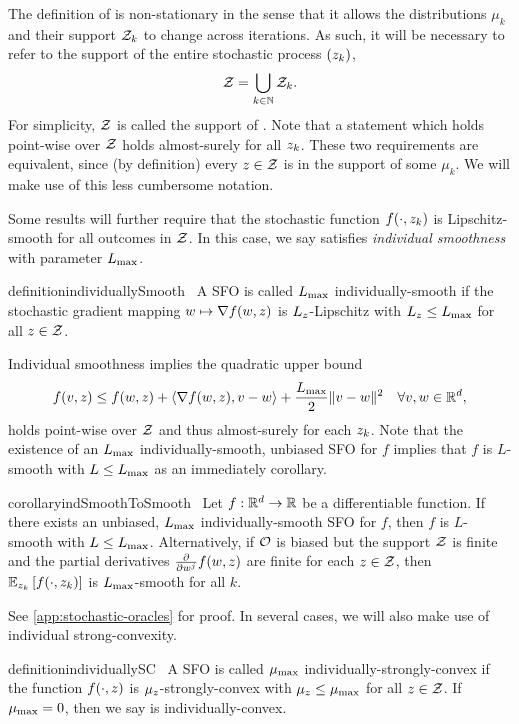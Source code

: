 The definition of \oracle{} is non-stationary in the sense that it allows the distributions \( \mu_k \) and their support \( \calZ_k \) to change across iterations.
As such, it will be necessary to refer to the support of the entire stochastic process \( \seq{\zk} \), 
\[ \calZ = \bigcup_{k\in \bbN} \calZ_k. \]
For simplicity, \( \calZ \) is called the support of \oracle{}. 
Note that a statement which holds point-wise over \( \calZ \) holds almost-surely for all \( \zk \).
These two requirements are equivalent, since (by definition) every \( \z \in \calZ \) is in the support of some \( \mu_k \).
We will make use of this less cumbersome notation. 

Some results will further require that the stochastic function \( f(\cdot, \zk) \) is Lipschitz-smooth for all outcomes in \( \calZ \).
In this case, we say \oracle{} satisfies \emph{individual smoothness} with parameter \( \Lmax \).
\begin{restatable}{definition}{individuallySmooth}~\label{def:individually-smooth}
    A \ac{SFO} \oracle{} is called \( \Lmax \) individually-smooth if the stochastic gradient mapping \( \w \mapsto \grad(\w, \z) \) is \( L_{\z} \)-Lipschitz with \( L_{\z} \leq \Lmax \) for all \( \z \in \calZ \).
\end{restatable}
\noindent Individual smoothness implies the quadratic upper bound
\[ f(v, \z) \leq f(\w, \z) + \abr{\grad(\w, \z), v - \w} + \frac{\Lmax}{2}\norm{v - \w}^2 \quad \forall v, \w \in \R^d, \]
holds point-wise over \( \calZ \) and thus almost-surely for each \( \zk \).
Note that the existence of an \( \Lmax \) individually-smooth, unbiased \ac{SFO} for \( f \) implies that \( f \) is \( L \)-smooth with \( L \leq \Lmax \) as an immediately corollary.
\begin{restatable}{corollary}{indSmoothToSmooth}~\label{cor:ind-smooth-to-smooth}
    Let \( f : \R^d \rightarrow \R \) be a differentiable function.  
    If there exists an unbiased, \( \Lmax \) individually-smooth \ac{SFO} \oracle{} for \( f \), then \( f \) is \( L \)-smooth with \( L \leq \Lmax \).
    Alternatively, if \( \oracle{} \) is biased but the support \( \calZ \) is finite and the partial derivatives \( \frac{\partial}{\partial w^j} f(\w, \z) \) are finite for each \( z \in \calZ \), then \( \Ek \sbr{f(\cdot, \zk)} \) is \( \Lmax \)-smooth for all \( k \). 
\end{restatable}
\noindent See \autoref{app:stochastic-oracles} for proof. 
In several cases, we will also make use of individual strong-convexity.
\begin{restatable}{definition}{individuallySC}~\label{def:individually-sc}
    A \ac{SFO} \oracle{} is called \( \mumax \) individually-strongly-convex if the function \( f(\cdot, \z) \) is \( \mu_{\z} \)-strongly-convex with \( \mu_{\z} \leq \mumax \) for all \( \z \in \calZ \).
    If \( \mumax = 0 \), then we say \oracle{} is individually-convex.
\end{restatable}

